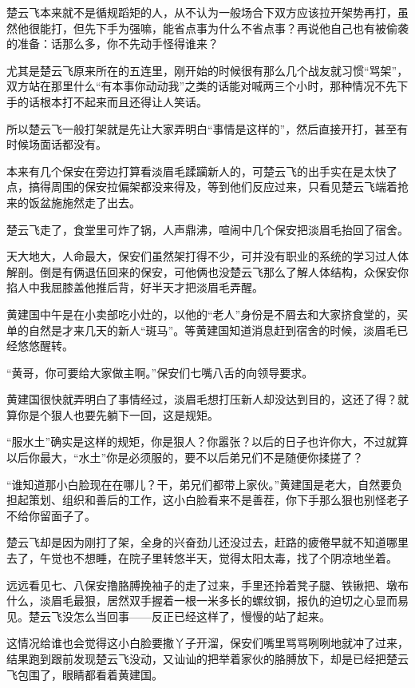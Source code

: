 楚云飞本来就不是循规蹈矩的人，从不认为一般场合下双方应该拉开架势再打，虽然他很能打，但先下手为强嘛，能省点事为什么不省点事？再说他自己也有被偷袭的准备：话那么多，你不先动手怪得谁来？

尤其是楚云飞原来所在的五连里，刚开始的时候很有那么几个战友就习惯“骂架”，双方站在那里什么“有本事你动动我”之类的话能对喊两三个小时，那种情况不先下手的话根本打不起来而且还得让人笑话。

所以楚云飞一般打架就是先让大家弄明白“事情是这样的”，然后直接开打，甚至有时候场面话都没有。

本来有几个保安在旁边打算看淡眉毛蹂躏新人的，可楚云飞的出手实在是太快了点，搞得周围的保安拉偏架都没来得及，等到他们反应过来，只看见楚云飞端着抢来的饭盆施施然走了出去。

楚云飞走了，食堂里可炸了锅，人声鼎沸，喧闹中几个保安把淡眉毛抬回了宿舍。

天大地大，人命最大，保安们虽然架打得不少，可并没有职业的系统的学习过人体解剖。倒是有俩退伍回来的保安，可他俩也没楚云飞那么了解人体结构，众保安你掐人中我屈膝盖他推后背，好半天才把淡眉毛弄醒。

黄建国中午是在小卖部吃小灶的，以他的“老人”身份是不屑去和大家挤食堂的，买单的自然是才来几天的新人“斑马”。等黄建国知道消息赶到宿舍的时候，淡眉毛已经悠悠醒转。

“黄哥，你可要给大家做主啊。”保安们七嘴八舌的向领导要求。

黄建国很快就弄明白了事情经过，淡眉毛想打压新人却没达到目的，这还了得？就算你是个狠人也要先躺下一回，这是规矩。

“服水土”确实是这样的规矩，你是狠人？你嚣张？以后的日子也许你大，不过就算以后你最大，“水土”你是必须服的，要不以后弟兄们不是随便你揉搓了？

“谁知道那小白脸现在在哪儿？干，弟兄们都带上家伙。”黄建国是老大，自然要负担起策划、组织和善后的工作，这小白脸看来不是善茬，你下手那么狠也别怪老子不给你留面子了。

楚云飞却是因为刚打了架，全身的兴奋劲儿还没过去，赶路的疲倦早就不知道哪里去了，午觉也不想睡，在院子里转悠半天，觉得太阳太毒，找了个阴凉地坐着。

远远看见七、八保安撸胳膊挽袖子的走了过来，手里还拎着凳子腿、铁锹把、墩布什么，淡眉毛最狠，居然双手握着一根一米多长的螺纹钢，报仇的迫切之心显而易见。楚云飞没怎么当回事——反正已经这样了，慢慢的站了起来。

这情况给谁也会觉得这小白脸要撒丫子开溜，保安们嘴里骂骂咧咧地就冲了过来，结果跑到跟前发现楚云飞没动，又讪讪的把举着家伙的胳膊放下，却是已经把楚云飞包围了，眼睛都看着黄建国。

